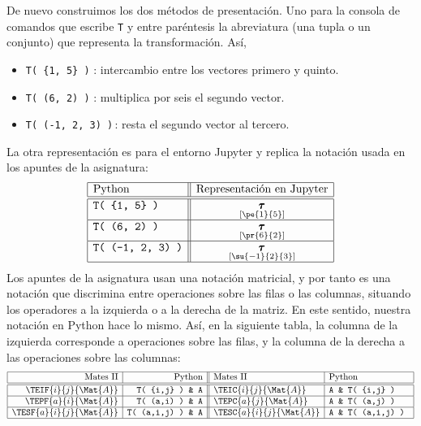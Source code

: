 \documentclass[11pt]{report}
\begin{document}
De nuevo construimos los dos métodos de presentación. Uno para la
consola de comandos que escribe \texttt{T} y entre paréntesis la
abreviatura (una tupla o un conjunto) que representa la
transformación. Así,
\begin{itemize}
\item  \Verb/T( {1, 5} )/ \qquad: intercambio entre los vectores primero y quinto.
\item  \Verb/T( (6, 2) )/ \qquad: multiplica por seis el segundo vector.
\item  \Verb/T( (-1, 2, 3) )/\,: resta el segundo vector al tercero.
\end{itemize}
La otra representación es para el entorno Jupyter y replica la
notación usada en los apuntes de la asignatura:
\begin{displaymath}
  \begin{array}{|l||c|}
    \hline
    \text{Python} & \text{Representación en Jupyter} \\
    \hline\hline
    \text{\tt T( \{1, 5\} )}   & \underset{\left[\pe{1}{5}\right]}{\pmb{\tau}}\\\hline
    \text{\tt T( (6, 2) )}     & \underset{\left[\pr{6}{2}\right]}{\pmb{\tau}}                      \\\hline
    \text{\tt T( (-1, 2, 3) )} & \underset{\left[\su{-1}{2}{3}\right]}{\pmb{\tau}}          \\\hline
  \end{array}
\end{displaymath}
Los apuntes de la asignatura usan una notación matricial, y por tanto
es una notación que discrimina entre operaciones sobre las filas o las
columnas, situando los operadores a la izquierda o a la derecha de la
matriz. En este sentido, nuestra notación en Python hace lo
mismo. Así, en la siguiente tabla, la columna de la izquierda
corresponde a operaciones sobre las filas, y la columna de la derecha
a las operaciones sobre las columnas:
\begin{displaymath}
  \begin{array}{|r|r||l|l|}
    \hline
    \text{Mates II}&\text{Python} & \text{Mates II}&\text{Python}\\
    \hline\hline
    \TEIF{i}{j}{\Mat{A}}     & \text{{\tt T( \{i,j\} ) \& A}} &
    \TEIC{i}{j}{\Mat{A}}     & \text{{\tt A \& T( \{i,j\} ) }} \\ \hline
    \TEPF{a}{i}{\Mat{A}}     & \text{{\tt T( (a,i) ) \& A}}    &
    \TEPC{a}{j}{\Mat{A}}     & \text{{\tt A \& T( (a,j) ) }}   \\ \hline
    \TESF{a}{i}{j}{\Mat{A}} & \text{{\tt T( (a,i,j) ) \& A}}  &
    \TESC{a}{i}{j}{\Mat{A}} & \text{{\tt A \& T( (a,i,j) ) }} \\ \hline    
  \end{array}
\end{displaymath}
\end{document}
